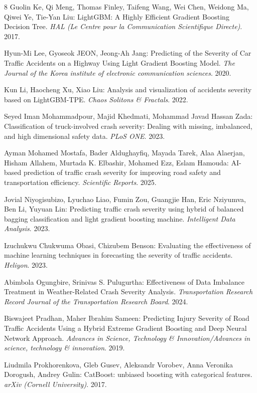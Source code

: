 \documentclass[runningheads]{llncs}
\begin{document}
\begin{thebibliography}{8}
Guolin Ke, Qi Meng, Thomas Finley, Taifeng Wang, Wei Chen, Weidong Ma, Qiwei Ye, Tie‐Yan Liu: LightGBM: A Highly Efficient Gradient Boosting Decision Tree. \textit{HAL (Le Centre pour la Communication Scientifique Directe)}. 2017.

Hyun-Mi Lee, Gyoseok JEON, Jeong-Ah Jang: Predicting of the Severity of Car Traffic Accidents on a Highway Using Light Gradient Boosting Model. \textit{The Journal of the Korea institute of electronic communication sciences}. 2020. 

Kun Li, Haocheng Xu, Xiao Liu: Analysis and visualization of accidents severity based on LightGBM-TPE. \textit{Chaos Solitons \& Fractals}. 2022. 

Seyed Iman Mohammadpour, Majid Khedmati, Mohammad Javad Hassan Zada: Classification of truck-involved crash severity: Dealing with missing, imbalanced, and high dimensional safety data. \textit{PLoS ONE}. 2023. 

Ayman Mohamed Mostafa, Bader Aldughayfiq, Mayada Tarek, Alaa Alaerjan, Hisham Allahem, Murtada K. Elbashir, Mohamed Ezz, Eslam Hamouda: AI-based prediction of traffic crash severity for improving road safety and transportation efficiency. \textit{Scientific Reports}. 2025. 

Jovial Niyogisubizo, Lyuchao Liao, Fumin Zou, Guangjie Han, Eric Nziyumva, Ben Li, Yuyuan Lin: Predicting traffic crash severity using hybrid of balanced bagging classification and light gradient boosting machine. \textit{Intelligent Data Analysis}. 2023. 

Izuchukwu Chukwuma Obasi, Chizubem Benson: Evaluating the effectiveness of machine learning techniques in forecasting the severity of traffic accidents. \textit{Heliyon}. 2023. 

Abimbola Ogungbire, Srinivas S. Pulugurtha: Effectiveness of Data Imbalance Treatment in Weather-Related Crash Severity Analysis. \textit{Transportation Research Record Journal of the Transportation Research Board}. 2024. 

Biswajeet Pradhan, Maher Ibrahim Sameen: Predicting Injury Severity of Road Traffic Accidents Using a Hybrid Extreme Gradient Boosting and Deep Neural Network Approach. \textit{Advances in Science, Technology \& Innovation/Advances in science, technology \& innovation}. 2019. 

Liudmila Prokhorenkova, Gleb Gusev, Aleksandr Vorobev, Anna Veronika Dorogush, Andrey Gulin: CatBoost: unbiased boosting with categorical features. \textit{arXiv (Cornell University)}. 2017. 


\end{thebibliography}
\end{document}
